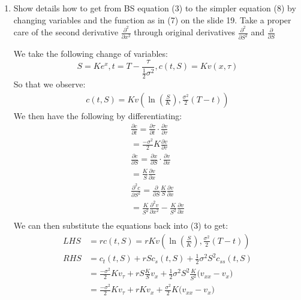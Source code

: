 \documentclass[12pt,twoside, letter]{exam}
\theoremstyle{definition}
\begin{document}
\begin{enumerate}
  \item Show details how to get from BS equation (3) to the simpler equation (8) by changing variables and the function as in (7) on
    the slide 19. Take a proper care of the second derivative $\frac{\partial^2}{\partial x^2}$ through original derivatives
    $\frac{\partial^2}{\partial S^2}$ and $\frac{\partial}{\partial S}$
      \begin{solution}
        We take the following change of variables:
        \begin{equation*}
          S = Ke^x, t = T - \frac{\tau}{\frac{1}{2}\sigma^2}, c(t,S) = Kv(x, \tau)
        \end{equation*}
        So that we observe:
        \begin{align*}
          c(t,S) = Kv(\ln(\frac{S}{K}), \frac{\sigma^2}{2}(T-t))
        \end{align*}
        We then have the following by differentiating:
        \begin{align*}
          \frac{\partial c}{\partial t} = \frac{\partial \tau}{\partial t} \cdot \frac{\partial v}{\partial \tau}\\
          = \frac{-\sigma^2}{2}K \frac{\partial v}{\partial \tau} \\
          \frac{\partial c}{\partial S} = \frac{\partial x}{\partial S} \cdot \frac{\partial v}{\partial x}\\
          = \frac{K}{S} \frac{\partial v}{\partial x} \\
          \frac{\partial^2 c}{\partial S^2} = \frac{\partial}{\partial S} \frac{K}{S} \frac{\partial v}{\partial x} \\
          = \frac{K}{S^2}\frac{\partial^2 v}{\partial x^2} - \frac{K}{S^2} \frac{\partial v}{\partial x} \\
        \end{align*}
        We can then substitute the equations back into (3) to get:
        \begin{align*}
          LHS &= rc(t,S) = rKv(\ln(\frac{S}{K}), \frac{\sigma^2}{2}(T-t)) \\
          RHS &= c_t(t,S) + rSc_s(t,S) + \frac{1}{2} \sigma^2 S^2c_{ss}(t,S) \\
          &= \frac{-\sigma^2}{2}K v_\tau + rS \frac{K}{S} v_x + \frac{1}{2} \sigma^2 S^2 \frac{K}{S^2}\big(v_{xx} - v_x \big) \\
          &= \frac{-\sigma^2}{2}K v_\tau + rK v_x + \frac{\sigma^2}{2} K \big(v_{xx} - v_x \big) \\

\end{align*}
\end{solution}
\end{enumerate}
\end{document}
